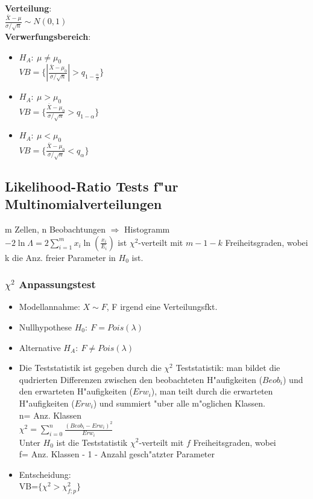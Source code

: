 \documentclass[10pt, a4paper, twocolumn]{scrartcl}
\begin{document}
\textbf{Verteilung}:\\
$\frac{\bar{X}-\mu}{\sigma/\sqrt{n}}\sim N(0,1)$\\

\textbf{Verwerfungsbereich}:
\begin{itemize}
 \item $H_A:\:\mu\neq\mu_0$\\
  $VB=\{|\frac{\bar{X}-\mu_0}{\sigma /\sqrt{n}}|>q_{1-\frac{\alpha}{2}}\}$
 \item $H_A:\:\mu>\mu_0$\\
  $VB=\{\frac{\bar{X}-\mu_0}{\sigma /\sqrt{n}}>q_{1-\alpha}\}$
 \item $H_A:\:\mu<\mu_0$\\
  $VB=\{\frac{\bar{X}-\mu_0}{\sigma /\sqrt{n}}<q_{\alpha}\}$
\end{itemize}


\subsection{Likelihood-Ratio Tests f"ur Multinomialverteilungen}

m Zellen, n Beobachtungen $\Rightarrow$ Histogramm\\

$-2\ln\Lambda=2\sum\limits^m_{i=1}x_i\ln(\frac{x_i}{E_i})$ ist $\chi^2$-verteilt mit $m-1-k$ Freiheitsgraden, wobei k die Anz. freier Parameter in $H_0$ ist.

\subsubsection{$\chi^2$ Anpassungstest}

\begin{itemize}
 \item Modellannahme: $X \sim F$, F irgend eine Verteilungsfkt.
 \item Nullhypothese $H_0:\:F=Pois(\lambda)$
 \item Alternative $H_A:\:F\neq Pois(\lambda)$
 \item Die Teststatistik ist gegeben durch die $\chi^2$ Teststatistik: man bildet die qudrierten Differenzen zwischen den beobachteten H"aufigkeiten ($Beob_i$) und den erwarteten H"aufigkeiten ($Erw_i$), man teilt durch die erwarteten H"aufigkeiten ($Erw_i$) und summiert "uber alle m"oglichen Klassen.\\
  n= Anz. Klassen\\
  $\chi^2=\sum\limits^n_{i=0}\frac{(Beob_i-Erw_i)^2}{Erw_i}$\\
  Unter $H_0$ ist die Teststatistik $\chi^2$-verteilt mit $f$ Freiheitsgraden, wobei\\
  f= Anz. Klassen - 1 - Anzahl gesch"atzter Parameter
 \item Entscheidung:\\
  VB=$\{\chi^2>\chi^2_{f;p}\}$
\end{itemize}
\end{document}
